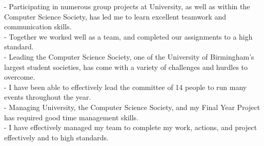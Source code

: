 \documentclass[twoside]{article}
\begin{document}
- Participating in numerous group projects at University, as well as within the Computer Science Society, has led me to learn excellent teamwork and communication skills.\\
- Together we worked well as a team, and completed our assignments to a high standard.\\
- Leading the Computer Science Society, one of the University of Birmingham's largest student societies, has come with a variety of challenges and hurdles to overcome.\\
- I have been able to effectively lead the committee of 14 people to run many events throughout the year.\\
- Managing University, the Computer Science Society, and my Final Year Project has required good time management skills.\\
- I have effectively managed my team to complete my work, actions, and project effectively and to high standards.\vspace{2pt}
\end{document}
